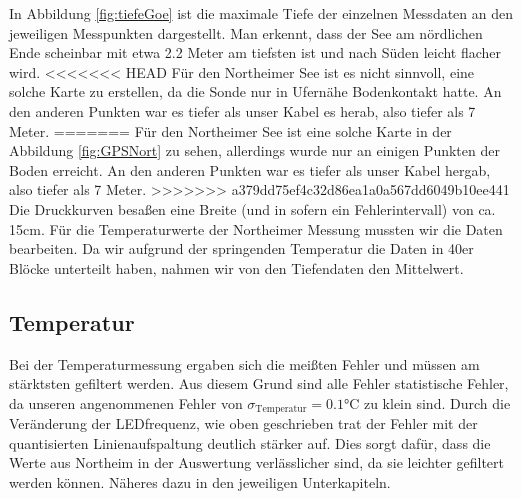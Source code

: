 \documentclass[12pt,a4paper,titlepage,headinclude,bibtotoc]{scrartcl}
\numberwithin{equation}{subsection}
\begin{document}
In Abbildung \ref{fig:tiefeGoe} ist die maximale Tiefe der einzelnen Messdaten an den jeweiligen Messpunkten dargestellt.
Man erkennt, dass der See am nördlichen Ende scheinbar mit etwa 2.2 Meter am tiefsten ist und nach Süden leicht flacher wird.
<<<<<<< HEAD
Für den Northeimer See ist es nicht sinnvoll, eine solche Karte zu erstellen, da die Sonde nur in Ufernähe Bodenkontakt hatte.
An den anderen Punkten war es tiefer als unser Kabel es herab, also tiefer als 7 Meter.
=======
Für den Northeimer See ist eine solche Karte in der Abbildung \ref{fig:GPSNort} zu sehen, allerdings wurde nur an einigen Punkten der Boden erreicht.
An den anderen Punkten war es tiefer als unser Kabel hergab, also tiefer als 7 Meter.
>>>>>>> a379dd75ef4c32d86ea1a0a567dd6049b10ee441
Die Druckkurven besaßen eine Breite (und in sofern ein Fehlerintervall) von ca. 15cm.
Für die Temperaturwerte der Northeimer Messung mussten wir die Daten bearbeiten.
Da wir aufgrund der springenden Temperatur die Daten in 40er Blöcke unterteilt haben, nahmen wir von den Tiefendaten den Mittelwert.


\subsection{Temperatur}
Bei der Temperaturmessung ergaben sich die meißten Fehler und müssen am stärktsten gefiltert werden.
Aus diesem Grund sind alle Fehler statistische Fehler, da unseren angenommenen Fehler von $\sigma_\text{Temperatur}=0.1\si{\celsius}$ zu klein sind.
Durch die Veränderung der LEDfrequenz, wie oben geschrieben trat der Fehler mit der quantisierten Linienaufspaltung deutlich stärker auf.
Dies sorgt dafür, dass die Werte aus Northeim in der Auswertung verlässlicher sind, da sie leichter gefiltert werden können.
Näheres dazu in den jeweiligen Unterkapiteln.
\end{document}
